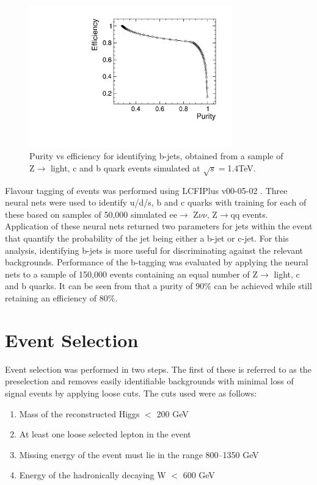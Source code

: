\begin{figure}
  \centering
  \includegraphics[width=0.78\textwidth,keepaspectratio]{HiggsAnalysis/figures/updatedpurityvsefficiency.pdf}
  \caption[B-Tagging Purity vs Efficiency]{Purity vs efficiency for identifying b-jets, obtained from a sample of Z$\rightarrow$ light, c and b quark events simulated at $\sqrt{s}=$1.4TeV.}
  \label{btag}
\end{figure}

Flavour tagging of events was performed using LCFIPlus v00-05-02 \cite{Suehara:2015ura}. Three neural nets were used to identify u/d/s, b and c quarks with training for each of these based on samples of 50,000 simulated ee$\rightarrow$ Z$\nu\nu$, Z$\rightarrow$qq events. Application of these neural nets returned two parameters for jets within the event that quantify the probability of the jet being either a b-jet or c-jet. For this analysis, identifying b-jets is more useful for discriminating against the relevant backgrounds. Performance of the b-tagging was evaluated by applying the neural nets to a sample of 150,000 events containing an equal number of Z$\rightarrow$ light, c and b quarks. It can be seen from  that a purity of 90\% can be achieved while still retaining an efficiency of 80\%.

\section{Event Selection}

Event selection was performed in two steps. The first of these is referred to as the preselection and removes easily identifiable backgrounds with minimal loss of signal events by applying loose cuts. The cuts used were as follows:

\begin{enumerate}

\item Mass of the reconstructed Higgs $<$ 200 GeV
\item At least one loose selected lepton in the event
\item Missing energy of the event must lie in the range 800--1350 GeV
\item Energy of the hadronically decaying W $<$ 600 GeV

\end{enumerate}


